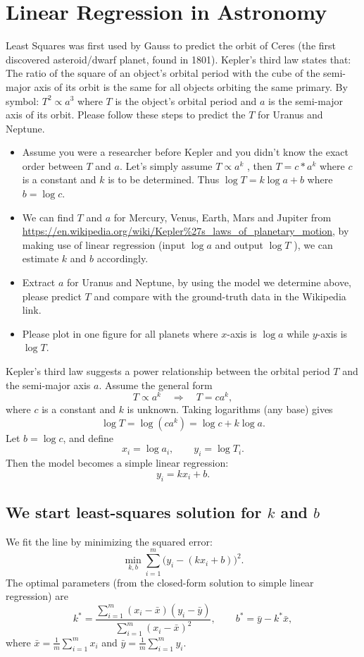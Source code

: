 \documentclass[11pt]{article}
\begin{document}
\newpage
\section*{Linear Regression in Astronomy}
Least Squares was first used by Gauss to predict the orbit of Ceres (the first discovered asteroid/dwarf planet, found in 1801). Kepler's third law states that: The ratio of the square of an object's orbital period with the cube of the semi-major axis of its orbit is the same for all objects orbiting the same primary. By symbol:  $T^2\propto a^3$  where  $T$  is the object's orbital period and  $a$  is the semi-major axis of its orbit. Please follow these steps to predict the  $T$  for Uranus and Neptune.
\begin{itemize}
	\item Assume you were a researcher before Kepler and you didn't know the exact order between  $T$  and  $a$. Let's simply assume  $T\propto a^k$ , then  $T=c*a^k$  where  $c$  is a constant and  $k$  is to be determined. Thus  $\log T=k\log a+b$  where  $b=\log c$.
	\item We can find  $T$  and  $a$  for Mercury, Venus, Earth, Mars and Jupiter from \url{https://en.wikipedia.org/wiki/Kepler%27s_laws_of_planetary_motion}, by making use of linear regression (input  $\log a$  and output  $\log T$ ), we can estimate  $k$  and  $b$  accordingly.
	\item Extract  $a$  for Uranus and Neptune, by using the model we determine above, please predict  $T$  and compare with the ground-truth data in the Wikipedia link.
	\item Please plot in one figure for all planets where $x$-axis is $\log a$ while $y$-axis is $\log T$.
\end{itemize}


Kepler's third law suggests a power relationship between the orbital period $T$ and the semi-major axis $a$. 
Assume the general form
\[
T \propto a^k \quad \Rightarrow \quad T = c a^k,
\]
where $c$ is a constant and $k$ is unknown. Taking logarithms (any base) gives
\[
\log T = \log(ca^k) = \log c + k\log a.
\]
Let $b=\log c$, and define
\[
x_i=\log a_i,\qquad y_i=\log T_i.
\]
Then the model becomes a simple linear regression:
\[
y_i = kx_i + b.
\]

\subsection*{We start least-squares solution for $k$ and $b$}
We fit the line by minimizing the squared error:
\[
\min_{k,b}\sum_{i=1}^{m}\big(y_i-(kx_i+b)\big)^2.
\]
The optimal parameters (from the closed-form solution to simple linear regression) are
\[
k^*=\frac{\sum_{i=1}^{m}(x_i-\bar x)(y_i-\bar y)}{\sum_{i=1}^{m}(x_i-\bar x)^2},
\qquad
b^*=\bar y-k^*\bar x,
\]
where $\bar x=\frac{1}{m}\sum_{i=1}^m x_i$ and $\bar y=\frac{1}{m}\sum_{i=1}^m y_i$.
\end{document}
